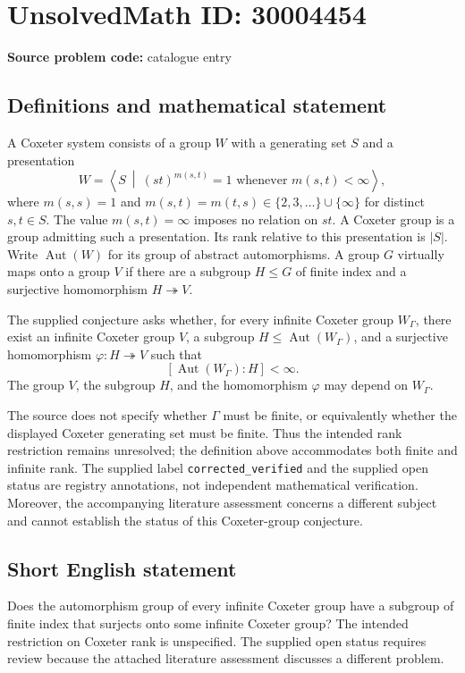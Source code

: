 \documentclass[11pt]{article}
\begin{document}
\section*{UnsolvedMath ID: 30004454}
\textbf{Source problem code:} catalogue entry
\subsection{Definitions and mathematical statement}
A Coxeter system consists of a group \(W\) with a generating set \(S\) and a presentation
\[
W=\left\langle S\ \middle|\ (st)^{m(s,t)}=1\text{ whenever }m(s,t)<\infty\right\rangle,
\]
where \(m(s,s)=1\) and \(m(s,t)=m(t,s)\in\{2,3,\ldots\}\cup\{\infty\}\) for distinct \(s,t\in S\). The value \(m(s,t)=\infty\) imposes no relation on \(st\). A Coxeter group is a group admitting such a presentation. Its rank relative to this presentation is \(|S|\). Write \(\operatorname{Aut}(W)\) for its group of abstract automorphisms. A group \(G\) virtually maps onto a group \(V\) if there are a subgroup \(H\leq G\) of finite index and a surjective homomorphism \(H\twoheadrightarrow V\).

The supplied conjecture asks whether, for every infinite Coxeter group \(W_\Gamma\), there exist an infinite Coxeter group \(V\), a subgroup \(H\leq\operatorname{Aut}(W_\Gamma)\), and a surjective homomorphism \(\varphi:H\twoheadrightarrow V\) such that
\[
[\operatorname{Aut}(W_\Gamma):H]<\infty.
\]
The group \(V\), the subgroup \(H\), and the homomorphism \(\varphi\) may depend on \(W_\Gamma\).

The source does not specify whether \(\Gamma\) must be finite, or equivalently whether the displayed Coxeter generating set must be finite. Thus the intended rank restriction remains unresolved; the definition above accommodates both finite and infinite rank. The supplied label \texttt{corrected\_verified} and the supplied open status are registry annotations, not independent mathematical verification. Moreover, the accompanying literature assessment concerns a different subject and cannot establish the status of this Coxeter-group conjecture.
\subsection{Short English statement}
Does the automorphism group of every infinite Coxeter group have a subgroup of finite index that surjects onto some infinite Coxeter group? The intended restriction on Coxeter rank is unspecified. The supplied open status requires review because the attached literature assessment discusses a different problem.
\end{document}
